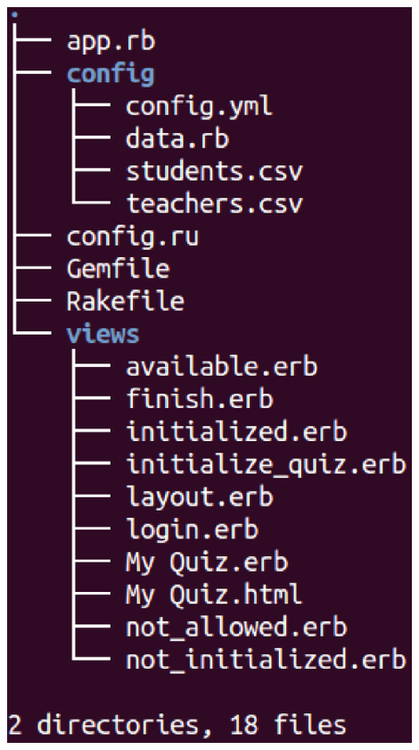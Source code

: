 \documentclass{beamer}
\begin{document}
\begin{frame}[allowframebreaks]
\begin{itemize}
\begin{columns}
\begin{column}{4cm}
\begin{center}
          \includegraphics[width=0.9\textwidth]{img/tree.eps}
        \end{center}
      \end{column}
    \end{columns}
    
    \framebreak
    

\end{itemize}
\end{frame}
\end{document}
